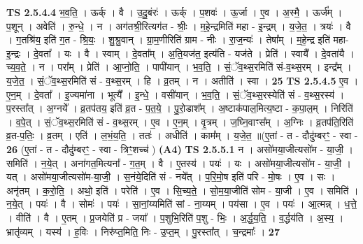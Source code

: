 \documentclass[17pt]{extarticle}
\begin{document}
                  \newline
                                \textbf{ TS 2.5.4.4} \newline
                  भ॒व॒ति॒ । ऊर्क् । वै । उ॒दु॒बंरः॑ । ऊर्क् । प॒शवः॑ । ऊ॒र्जा । ए॒व । अ॒स्मै॒ । ऊर्ज᳚म् । प॒शून् । अवेति॑ । रु॒न्धे॒ । न । अग॑तश्री॒रित्यग॑त - श्रीः॒ । म॒हे॒न्द्रमिति॑ महा - इ॒न्द्रम् । य॒जे॒त॒ । त्रयः॑ । वै । ग॒तश्रि॑य॒ इति॑ ग॒त - श्रि॒यः॒ । शु॒श्रु॒वान् । ग्रा॒म॒णीरिति॑ ग्राम - नीः । रा॒ज॒न्यः॑ । तेषा᳚म् । म॒हे॒न्द्र इति॑ महा-इ॒न्द्रः । दे॒वता᳚ । यः । वै । स्वाम् । दे॒वता᳚म् । अ॒ति॒यज॑त॒ इत्य॑ति - यज॑ते । प्रेति॑ । स्वायै᳚ । दे॒वता॑यै । च्य॒व॒ते॒ । न । परा᳚म् । प्रेति॑ । आ॒प्नो॒ति॒ । पापी॑यान् । भ॒व॒ति॒ । सं॒ॅव॒थ्स॒रमिति॑ सं-व॒थ्स॒रम् । इन्द्र᳚म् । य॒जे॒त॒ । सं॒ॅव॒थ्स॒रमिति॑ सं - व॒थ्स॒रम् । हि । व्र॒तम् । न । अतीति॑ । स्वा । \textbf{  25} \newline
                  \newline
                                \textbf{ TS 2.5.4.5} \newline
                  ए॒व । ए॒न॒म् । दे॒वता᳚ । इ॒ज्यमा॑ना । भूत्यै᳚ । इ॒न्धे॒ । वसी॑यान् । भ॒व॒ति॒ । सं॒ॅव॒थ्स॒रस्येति॑ सं - व॒थ्स॒रस्य॑ । प॒रस्ता᳚त् । अ॒ग्नये᳚ । व्र॒तप॑तय॒ इति॑ व्र॒त - प॒त॒ये॒ । पु॒रो॒डाश᳚म् । अ॒ष्टाक॑पाल॒मित्य॒ष्टा - क॒पा॒ल॒म् । निरिति॑ । व॒पे॒त् । सं॒ॅव॒थ्स॒रमिति॑ सं - व॒थ्स॒रम् । ए॒व । ए॒न॒म् । वृ॒त्रम् । ज॒घ्नि॒वाꣳस᳚म् । अ॒ग्निः । व्र॒तप॑ति॒रिति॑ व्र॒त-प॒तिः॒ । व्र॒तम् । एति॑ । ल॒भं॒य॒ति॒ । ततः॑ । अधीति॑ । काम᳚म् । य॒जे॒त॒ ॥(ए॒तां - त - दौदु॑म्बरꣳ॒॒ - स्वा - \textbf{  26 } \newline
                  \newline
                      (ए॒तां - त - दौदु॑म्बरꣳ॒॒ - स्वा - त्रिꣳ॒॒शच्च॑ ) \textbf{(A4)} \newline \newline
                                \textbf{ TS 2.5.5.1} \newline
                  न । असो॑मया॒जीत्यसो॑म - या॒जी॒ । समिति॑ । न॒ये॒त् । अना॑गत॒मित्यना᳚ - ग॒त॒म् । वै । ए॒तस्य॑ । पयः॑ । यः । असो॑मया॒जीत्यसो॑म - या॒जी॒ । यत् । असो॑मया॒जीत्यसो॑म-या॒जी॒ । स॒नंये॒दिति॑ सं - नये᳚त् । प॒रि॒मो॒ष इति॑ परि - मो॒षः । ए॒व । सः । अनृ॑तम् । क॒रो॒ति॒ । अथो॒ इति॑ । परेति॑ । ए॒व । सि॒च्य॒ते॒ । सो॒म॒या॒जीति॑ सोम - या॒जी । ए॒व । समिति॑ । न॒ये॒त् । पयः॑ । वै । सोमः॑ । पयः॑ । सा॒नां॒य्यमिति॑ सां - ना॒य्यम् । पय॑सा । ए॒व । पयः॑ । आ॒त्मन्न् । ध॒त्ते॒ । वीति॑ । वै । ए॒तम् । प्र॒जयेति॑ प्र - जया᳚ । प॒शुभि॒रिति॑ प॒शु - भिः॒ । अ॒र्द्ध॒य॒ति॒ । व॒र्द्धय॑ति । अ॒स्य॒ । भ्रातृ॑व्यम् । यस्य॑ । ह॒विः । निरु॑प्त॒मिति॒ निः - उ॒प्त॒म् । पु॒रस्ता᳚त् । च॒न्द्रमाः᳚ । \textbf{  27} \newline
\end{document}
